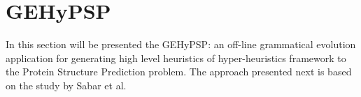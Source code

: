 \documentclass[conference]{IEEEtran}
\begin{document}
%
%
%
%
%	
%	 
% 
%	
%
%	
%


\section{GEHyPSP}
\label{sec:methodology}
In this section will be presented the GEHyPSP: an off-line grammatical evolution application for generating high level heuristics of hyper-heuristics framework to the Protein Structure Prediction problem. The approach presented next is based on the study by Sabar et al. \cite{sabar2015automatic}
\end{document}
